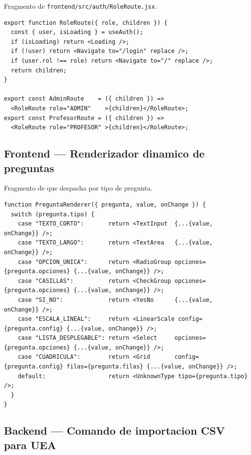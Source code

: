 Fragmento de \texttt{frontend/src/auth/RoleRoute.jsx}.

\begin{Verbatim}[fontsize=\small, frame=single]
export function RoleRoute({ role, children }) {
  const { user, isLoading } = useAuth();
  if (isLoading) return <Loading />;
  if (!user) return <Navigate to="/login" replace />;
  if (user.rol !== role) return <Navigate to="/" replace />;
  return children;
}

export const AdminRoute    = ({ children }) =>
  <RoleRoute role="ADMIN"    >{children}</RoleRoute>;
export const ProfesorRoute = ({ children }) =>
  <RoleRoute role="PROFESOR" >{children}</RoleRoute>;
\end{Verbatim}

\subsection{Frontend --- Renderizador dinamico de preguntas}\label{lst:renderer_preguntas}

Fragmento de  que despacha por tipo de pregunta.

\begin{Verbatim}[fontsize=\small, frame=single]
function PreguntaRenderer({ pregunta, value, onChange }) {
  switch (pregunta.tipo) {
    case "TEXTO_CORTO":       return <TextInput  {...{value, onChange}} />;
    case "TEXTO_LARGO":       return <TextArea   {...{value, onChange}} />;
    case "OPCION_UNICA":      return <RadioGroup opciones={pregunta.opciones} {...{value, onChange}} />;
    case "CASILLAS":          return <CheckGroup opciones={pregunta.opciones} {...{value, onChange}} />;
    case "SI_NO":             return <YesNo      {...{value, onChange}} />;
    case "ESCALA_LINEAL":     return <LinearScale config={pregunta.config} {...{value, onChange}} />;
    case "LISTA_DESPLEGABLE": return <Select     opciones={pregunta.opciones} {...{value, onChange}} />;
    case "CUADRICULA":        return <Grid       config={pregunta.config} filas={pregunta.filas} {...{value, onChange}} />;
    default:                  return <UnknownType tipo={pregunta.tipo} />;
  }
}
\end{Verbatim}

\subsection{Backend --- Comando de importacion CSV para UEA}\label{lst:import_csv}

